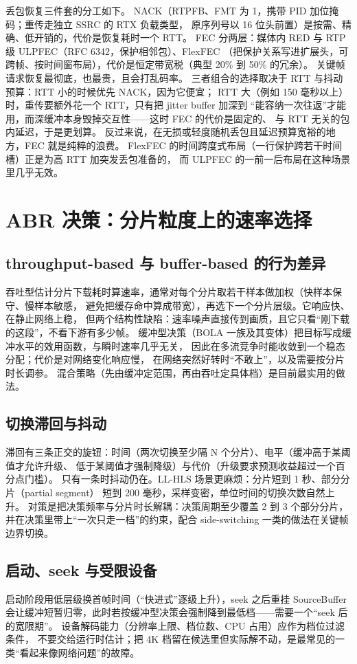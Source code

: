 \documentclass[12pt,a4paper,fontset=fandol]{ctexbook}
\begin{document}
丢包恢复三件套的分工如下。
NACK（RTPFB、FMT 为 1，携带 PID 加位掩码；重传走独立 SSRC 的 RTX 负载类型，
原序列号以 16 位头前置）是按需、精确、低开销的，代价是恢复耗时一个 RTT。
FEC 分两层：媒体内 RED 与 RTP 级 ULPFEC（RFC 6342，保护相邻包）、FlexFEC
（把保护关系写进扩展头，可跨帧、按时间窗布局），代价是恒定带宽税（典型 20\% 到 50\% 的冗余）。
关键帧请求恢复最彻底，也最贵，且会打乱码率。
三者组合的选择取决于 RTT 与抖动预算：RTT 小的时候优先 NACK，因为它便宜；
RTT 大（例如 150 毫秒以上）时，重传要额外花一个 RTT，只有把 jitter buffer 加深到
``能容纳一次往返''才能用，而深缓冲本身毁掉交互性——这时 FEC 的代价是固定的、
与 RTT 无关的包内延迟，于是更划算。
反过来说，在无损或轻度随机丢包且延迟预算宽裕的地方，FEC 就是纯粹的浪费。
FlexFEC 的时间跨度式布局（一行保护跨若干时间槽）正是为高 RTT 加突发丢包准备的，
而 ULPFEC 的一前一后布局在这种场景里几乎无效。

\section{ABR 决策：分片粒度上的速率选择}

\subsection*{throughput-based 与 buffer-based 的行为差异}
吞吐型估计分片下载耗时算速率，通常对每个分片取若干样本做加权（快样本保守、慢样本敏感，
避免把缓存命中算成带宽），再选下一个分片层级。它响应快、在静止网络上稳，
但两个结构性缺陷：速率噪声直接传到画质，且它只看``刚下载的这段''，不看下游有多少帧。
缓冲型决策（BOLA 一族及其变体）把目标写成缓冲水平的效用函数，与瞬时速率几乎无关，
因此在多流竞争时能收敛到一个稳态分配；代价是对网络变化响应慢，
在网络突然好转时``不敢上''，以及需要按分片时长调参。
混合策略（先由缓冲定范围，再由吞吐定具体档）是目前最实用的做法。

\subsection*{切换滞回与抖动}
滞回有三条正交的旋钮：时间（两次切换至少隔 N 个分片）、电平（缓冲高于某阈值才允许升级、
低于某阈值才强制降级）与代价（升级要求预测收益超过一个百分点门槛）。
只有一条时抖动仍在。LL-HLS 场景更麻烦：分片短到 1 秒、部分分片（partial segment）
短到 200 毫秒，采样变密，单位时间的切换次数自然上升。
对策是把决策频率与分片时长解耦：决策周期至少覆盖 2 到 3 个部分分片，
并在决策里带上``一次只走一档''的约束，配合 side-switching 一类的做法在关键帧边界切换。

\subsection*{启动、seek 与受限设备}
启动阶段用低层级换首帧时间（``快进式''逐级上升），seek 之后重挂 SourceBuffer
会让缓冲短暂归零，此时若按缓冲型决策会强制降到最低档——需要一个``seek 后的宽限期''。
设备解码能力（分辨率上限、档位数、CPU 占用）应作为档位过滤条件，
不要交给运行时估计；把 4K 档留在候选里但实际解不动，是最常见的一类``看起来像网络问题''的故障。
\end{document}
